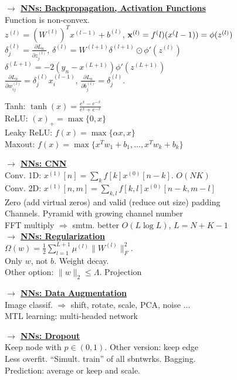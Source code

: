 \documentclass[]{article}
\newcommand{\myvector}[1]{{\bf{#1}}}
\newcommand{\x}{\myvector{x}}
\newcommand{\mytitle}[1]{ {\bf $\rightarrow$ \underline{#1}}\\}
\begin{document}
\begin{multicols*}{2}
\mytitle{NNs: Backpropagation, Activation Functions}
Function is non-convex.\\
$z^({l})=(W^{(l)})^Tx^{(l-1)}+b^{(l)}$, $\x^{(l)}=f^({l})(x^({l-1}))=\phi(z^{(l)})$\\
$\delta_j^{(l)}=\frac{\partial L_n}{\partial z_j^{(l)}}$, $\delta^{(l)}=W^{(l+1)}\delta^{(l+1)}\odot \phi'(z^{(l)})$\\
$\delta^{(L+1)}=-2(y_n-x^{(L+1)})\phi'(z^{(L+1)})$\\
$\frac{\partial L_n}{\partial w_{ij}^{(l)}}=\delta^{(l)}_jx_i^{(l-1)}$,
$\frac{\partial L_n}{\partial b_{j}^{(l)}}=\delta^{(l)}_j$.

Tanh: $\tanh(x)=\frac{e^x-e^{-x}}{e^x+e^{-x}}$\\
ReLU: $(x)_+=\max\{0, x\}$\\
Leaky ReLU: $f(x)=\max\{\alpha x, x\}$\\
Maxout: $f(x)=\max\{x^Tw_1+b_1,...,x^Tw_k+b_k\}$

\mytitle{NNs: CNN}
Conv. 1D: $x^{(1)}[n]=\sum\limits_kf[k]x^{(0)}[n-k]$. $O(NK)$\\
Conv. 2D: $x^{(1)}[n,m]=\sum\limits_{k,l}f[k,l]x^{(0)}[n-k,m-l]$\\
Zero (add virtual zeros) and valid (reduce out size) padding\\
Channels. Pyramid with growing channel number\\
FFT multiply $\Rightarrow$ smtm. better $O(L\log L)$, $L=N+K-1$\\

\mytitle{NNs: Regularization}
$\Omega(w)=\frac{1}{2}\sum\limits_{l=1}^{L+1}\mu^{(l)}\|W^{(l)}\|_F^2$.\\
Only $w$, not $b$. Weight decay.\\
Other option: $\|w\|_2\leqslant \Lambda$. Projection

\mytitle{NNs: Data Augmentation}
Image classif. $\Rightarrow$ shift, rotate, scale, PCA, noise ...\\
MTL learning: multi-headed network

\mytitle{NNs: Dropout}
Keep node with $p\in(0,1)$. Other version: keep edge\\
Less overfit. ``Simult. train'' of all sbntwrks. Bagging.\\
Prediction: average or keep and scale.


\end{multicols*}
\end{document}
